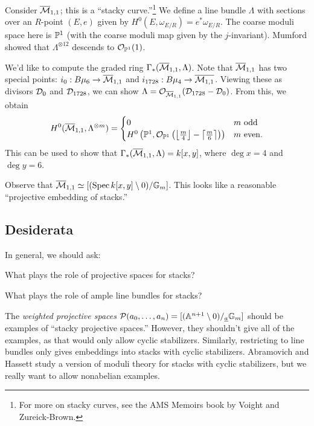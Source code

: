 \documentclass{amsart}
\begin{document}
Consider $\overline{\mathcal{M}}_{1,1}$; this is a ``stacky curve.''\footnote{For more on stacky curves, see the AMS Memoirs book by Voight and Zureick-Brown.}
We define a line bundle $\Lambda$ with sections over an $R$-point $(E, e)$ given by $H^0(E, \omega_{E/R}) = e^* \omega_{E/R}$.
The coarse moduli space here is $\mathbb{P}^1$ (with the coarse moduli map given by the $j$-invariant).
Mumford showed that $\Lambda^{\otimes 12}$ descends to $\mathcal{O}_{\mathbb{P}^1}(1)$.
	
We'd like to compute the graded ring $\Gamma_*(\overline{\mathcal{M}}_{1,1}, \Lambda)$.
Note that $\overline{\mathcal{M}}_{1,1}$ has two special points: $i_0: B\mu_6 \to \overline{\mathcal{M}}_{1,1}$ and $i_{1728}: B\mu_4 \to \overline{\mathcal{M}_{1,1}}$.
Viewing these as divisors $\mathcal{D}_0$ and $\mathcal{D}_{1728}$, we can show $\Lambda = \mathcal{O}_{\overline{\mathcal{M}}_{1,1}}(\mathcal{D}_{1728} - \mathcal{D}_0)$.
From this, we obtain
\[
	H^0(\overline{\mathcal{M}}_{1,1}, \Lambda^{\otimes m}) = \begin{cases}
		0 & m \textrm{ odd} \\
		H^0\left(\mathbb{P}^1, \mathcal{O}_{\mathbb{P}^1}\left( \left\lfloor \frac{m}{4} \right\rfloor - \left\lceil \frac{m}{6} \right\rceil \right)\right) & m \textrm{ even.}
	\end{cases}
\]
This can be used to show that $\Gamma_*(\overline{\mathcal{M}}_{1,1}, \Lambda) = k[x, y]$, where $\deg x = 4$ and $\deg y = 6$.

Observe that $\overline{\mathcal{M}}_{1,1} \simeq [(\operatorname{Spec} k[x, y] \setminus 0) / \mathbb{G}_m]$.
This looks like a reasonable ``projective embedding of stacks.''

\subsection{Desiderata}

In general, we should ask:

\begin{qn}
	What plays the role of projective spaces for stacks?
\end{qn}

\begin{qn}
	What plays the role of ample line bundles for stacks?
\end{qn}

The \emph{weighted projective spaces} $\mathcal{P}(a_0, \dots, a_n) = [(\mathbb{A}^{n+1} \setminus 0) /_{\underline{a}} \mathbb{G}_m]$ should be examples of ``stacky projective spaces.''
However, they shouldn't give all of the examples, as that would only allow cyclic stabilizers.
Similarly, restricting to line bundles only gives embeddings into stacks with cyclic stabilizers.
Abramovich and Hassett study a version of moduli theory for stacks with cyclic stabilizers, but we really want to allow nonabelian examples.
\end{document}
